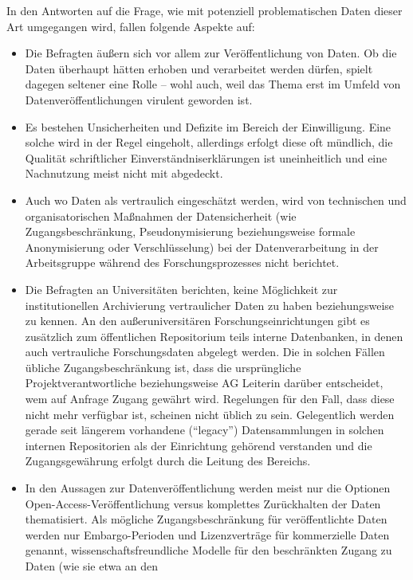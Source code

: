 \documentclass[a4paper,
fontsize=11pt,
oneside,
numbers=noperiodatend,
parskip=half-,
bibliography=totoc,
final
]{scrartcl}
\begin{document}
In den Antworten auf die Frage, wie mit potenziell problematischen Daten
dieser Art umgegangen wird, fallen folgende Aspekte auf:

\begin{itemize}
\item
  Die Befragten äußern sich vor allem zur Veröffentlichung von Daten. Ob
  die Daten überhaupt hätten erhoben und verarbeitet werden dürfen,
  spielt dagegen seltener eine Rolle -- wohl auch, weil das Thema erst
  im Umfeld von Datenveröffentlichungen virulent geworden ist.
\item
  Es bestehen Unsicherheiten und Defizite im Bereich der Einwilligung.
  Eine solche wird in der Regel eingeholt, allerdings erfolgt diese oft
  mündlich, die Qualität schriftlicher Einverständniserklärungen ist
  uneinheitlich und eine Nachnutzung meist nicht mit abgedeckt.
\item
  Auch wo Daten als vertraulich eingeschätzt werden, wird von
  technischen und organisatorischen Maßnahmen der Datensicherheit (wie
  Zugangsbeschränkung, Pseudonymisierung beziehungsweise formale
  Anonymisierung oder Verschlüsselung) bei der Datenverarbeitung in der
  Arbeitsgruppe während des Forschungsprozesses nicht berichtet.
\item
  Die Befragten an Universitäten berichten, keine Möglichkeit zur
  institutionellen Archivierung vertraulicher Daten zu haben
  beziehungsweise zu kennen. An den außeruniversitären
  Forschungseinrichtungen gibt es zusätzlich zum öffentlichen
  Repositorium teils interne Datenbanken, in denen auch vertrauliche
  Forschungsdaten abgelegt werden. Die in solchen Fällen übliche
  Zugangsbeschränkung ist, dass die ursprüngliche Projektverantwortliche
  beziehungsweise AG Leiterin darüber entscheidet, wem auf Anfrage
  Zugang gewährt wird. Regelungen für den Fall, dass diese nicht mehr
  verfügbar ist, scheinen nicht üblich zu sein. Gelegentlich werden
  gerade seit längerem vorhandene (\enquote{legacy}) Datensammlungen in
  solchen internen Repositorien als der Einrichtung gehörend verstanden
  und die Zugangsgewährung erfolgt durch die Leitung des Bereichs.
\item
  In den Aussagen zur Datenveröffentlichung werden meist nur die
  Optionen Open-Access-Veröffentlich\-ung versus komplettes Zurückhalten
  der Daten thematisiert. Als mögliche Zugangsbeschränkung für
  veröffentlichte Daten werden nur Embargo-Perioden und Lizenzverträge
  für kommerzielle Daten genannt, wissenschaftsfreundliche Modelle für
  den beschränkten Zugang zu Daten (wie sie etwa an den

\end{itemize}
\end{document}
